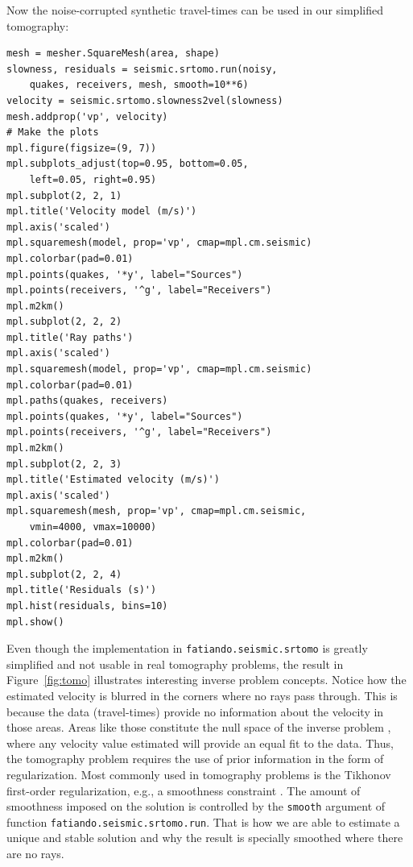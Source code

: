 Now the noise-corrupted synthetic travel-times can be used in our
simplified tomography:

\begin{verbatim}
mesh = mesher.SquareMesh(area, shape)
slowness, residuals = seismic.srtomo.run(noisy,
    quakes, receivers, mesh, smooth=10**6)
velocity = seismic.srtomo.slowness2vel(slowness)
mesh.addprop('vp', velocity)
# Make the plots
mpl.figure(figsize=(9, 7))
mpl.subplots_adjust(top=0.95, bottom=0.05,
    left=0.05, right=0.95)
mpl.subplot(2, 2, 1)
mpl.title('Velocity model (m/s)')
mpl.axis('scaled')
mpl.squaremesh(model, prop='vp', cmap=mpl.cm.seismic)
mpl.colorbar(pad=0.01)
mpl.points(quakes, '*y', label="Sources")
mpl.points(receivers, '^g', label="Receivers")
mpl.m2km()
mpl.subplot(2, 2, 2)
mpl.title('Ray paths')
mpl.axis('scaled')
mpl.squaremesh(model, prop='vp', cmap=mpl.cm.seismic)
mpl.colorbar(pad=0.01)
mpl.paths(quakes, receivers)
mpl.points(quakes, '*y', label="Sources")
mpl.points(receivers, '^g', label="Receivers")
mpl.m2km()
mpl.subplot(2, 2, 3)
mpl.title('Estimated velocity (m/s)')
mpl.axis('scaled')
mpl.squaremesh(mesh, prop='vp', cmap=mpl.cm.seismic,
    vmin=4000, vmax=10000)
mpl.colorbar(pad=0.01)
mpl.m2km()
mpl.subplot(2, 2, 4)
mpl.title('Residuals (s)')
mpl.hist(residuals, bins=10)
mpl.show()
\end{verbatim}

Even though the implementation in \texttt{fatiando.seismic.srtomo} is greatly
simplified and not usable in real tomography problems, the result in
Figure~\ref{fig:tomo} illustrates interesting inverse problem concepts.  Notice
how the estimated velocity is blurred in the corners where no rays pass
through. This is because the data (travel-times) provide no information about
the velocity in those areas. Areas like those constitute the null space of the
inverse problem \citep{menke1984}, where any velocity value estimated will
provide an equal fit to the data.  Thus, the tomography problem requires the
use of prior information in the form of regularization. Most commonly used in
tomography problems is the Tikhonov first-order regularization, e.g., a
smoothness constraint \citep{menke1984}. The amount of smoothness imposed on
the solution is controlled by the \texttt{smooth} argument of function
\texttt{fatiando.seismic.srtomo.run}. That is how we are able to estimate a
unique and stable solution and why the result is specially smoothed where there
are no rays.



